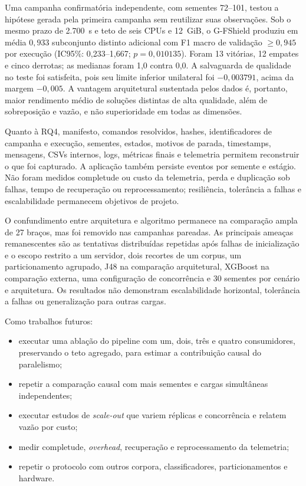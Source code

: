 Uma campanha confirmatória independente, com sementes 72--101, testou a hipótese gerada pela primeira campanha sem reutilizar suas observações. Sob o mesmo prazo de 2.700~s e teto de seis CPUs e 12~GiB, o G-FShield produziu em média $0{,}933$ subconjunto distinto adicional com F1 macro de validação $\geq 0{,}945$ por execução (IC95\%: 0,233--1,667; $p=0{,}010135$). Foram 13 vitórias, 12 empates e cinco derrotas; as medianas foram 1,0 contra 0,0. A salvaguarda de qualidade no teste foi satisfeita, pois seu limite inferior unilateral foi $-0{,}003791$, acima da margem $-0{,}005$. A vantagem arquitetural sustentada pelos dados é, portanto, maior rendimento médio de soluções distintas de alta qualidade, além de sobreposição e vazão, e não superioridade em todas as dimensões.



Quanto à RQ4, manifesto, comandos resolvidos, hashes, identificadores de campanha e execução, sementes, estados, motivos de parada, timestamps, mensagens, CSVs internos, logs, métricas finais e telemetria permitem reconstruir o que foi capturado. A aplicação também persiste eventos por semente e estágio. Não foram medidos completude ou custo da telemetria, perda e duplicação sob falhas, tempo de recuperação ou reprocessamento; resiliência, tolerância a falhas e escalabilidade permanecem objetivos de projeto.

O confundimento entre arquitetura e algoritmo permanece na comparação ampla de 27 braços, mas foi removido nas campanhas pareadas. As principais ameaças remanescentes são as tentativas distribuídas repetidas após falhas de inicialização e o escopo restrito a um servidor, dois recortes de um corpus, um particionamento agrupado, J48 na comparação arquitetural, XGBoost na comparação externa, uma configuração de concorrência e 30 sementes por cenário e arquitetura. Os resultados não demonstram escalabilidade horizontal, tolerância a falhas ou generalização para outras cargas.

Como trabalhos futuros:

\begin{itemize}
  \item executar uma ablação do pipeline com um, dois, três e quatro consumidores, preservando o teto agregado, para estimar a contribuição causal do paralelismo;
  \item repetir a comparação causal com mais sementes e cargas simultâneas independentes;
  \item executar estudos de \textit{scale-out} que variem réplicas e concorrência e relatem vazão por custo;
  \item medir completude, \textit{overhead}, recuperação e reprocessamento da telemetria;
  \item repetir o protocolo com outros corpora, classificadores, particionamentos e hardware.
\end{itemize}


